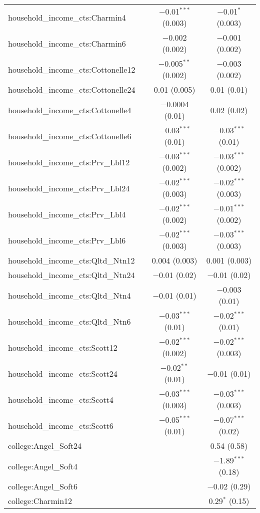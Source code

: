 \begin{table}[!htbp]
\begin{tabular}{@{\extracolsep{5pt}}lccc}
  household\_income\_cts:Charmin4 &  & $-$0.01$^{***}$ (0.003) & $-$0.01$^{*}$ (0.003) \\ 
  household\_income\_cts:Charmin6 &  & $-$0.002 (0.002) & $-$0.001 (0.002) \\ 
  household\_income\_cts:Cottonelle12 &  & $-$0.005$^{**}$ (0.002) & $-$0.003 (0.002) \\ 
  household\_income\_cts:Cottonelle24 &  & 0.01 (0.005) & 0.01 (0.01) \\ 
  household\_income\_cts:Cottonelle4 &  & $-$0.0004 (0.01) & 0.02 (0.02) \\ 
  household\_income\_cts:Cottonelle6 &  & $-$0.03$^{***}$ (0.01) & $-$0.03$^{***}$ (0.01) \\ 
  household\_income\_cts:Prv\_Lbl12 &  & $-$0.03$^{***}$ (0.002) & $-$0.03$^{***}$ (0.002) \\ 
  household\_income\_cts:Prv\_Lbl24 &  & $-$0.02$^{***}$ (0.003) & $-$0.02$^{***}$ (0.003) \\ 
  household\_income\_cts:Prv\_Lbl4 &  & $-$0.02$^{***}$ (0.002) & $-$0.01$^{***}$ (0.002) \\ 
  household\_income\_cts:Prv\_Lbl6 &  & $-$0.02$^{***}$ (0.003) & $-$0.03$^{***}$ (0.003) \\ 
  household\_income\_cts:Qltd\_Ntn12 &  & 0.004 (0.003) & 0.001 (0.003) \\ 
  household\_income\_cts:Qltd\_Ntn24 &  & $-$0.01 (0.02) & $-$0.01 (0.02) \\ 
  household\_income\_cts:Qltd\_Ntn4 &  & $-$0.01 (0.01) & $-$0.003 (0.01) \\ 
  household\_income\_cts:Qltd\_Ntn6 &  & $-$0.03$^{***}$ (0.01) & $-$0.02$^{***}$ (0.01) \\ 
  household\_income\_cts:Scott12 &  & $-$0.02$^{***}$ (0.002) & $-$0.02$^{***}$ (0.003) \\ 
  household\_income\_cts:Scott24 &  & $-$0.02$^{**}$ (0.01) & $-$0.01 (0.01) \\ 
  household\_income\_cts:Scott4 &  & $-$0.03$^{***}$ (0.003) & $-$0.03$^{***}$ (0.003) \\ 
  household\_income\_cts:Scott6 &  & $-$0.05$^{***}$ (0.01) & $-$0.07$^{***}$ (0.02) \\ 
  college:Angel\_Soft24 &  &  & 0.54 (0.58) \\ 
  college:Angel\_Soft4 &  &  & $-$1.89$^{***}$ (0.18) \\ 
  college:Angel\_Soft6 &  &  & $-$0.02 (0.29) \\ 
  college:Charmin12 &  &  & 0.29$^{*}$ (0.15) \\ 

\end{tabular}
\end{table}
